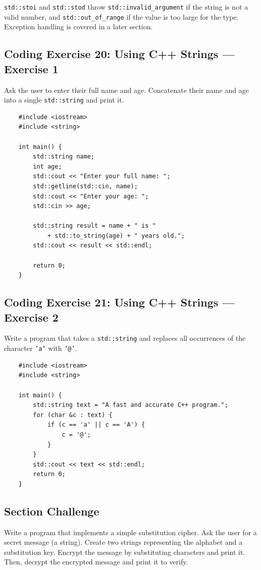 \begin{remark}
	\texttt{std::stoi} and \texttt{std::stod} throw \texttt{std::invalid\_argument} if the string is not a valid number, and \texttt{std::out\_of\_range} if the value is too large for the type. Exception handling is covered in a later section.
\end{remark}

\subsection{Coding Exercise 20: Using C++ Strings --- Exercise 1}
Ask the user to enter their full name and age. Concatenate their name and age into a single \texttt{std::string} and print it.
\begin{lstlisting}
	#include <iostream>
	#include <string>

	int main() {
		std::string name;
		int age;
		std::cout << "Enter your full name: ";
		std::getline(std::cin, name);
		std::cout << "Enter your age: ";
		std::cin >> age;

		std::string result = name + " is "
			+ std::to_string(age) + " years old.";
		std::cout << result << std::endl;

		return 0;
	}
\end{lstlisting}

\subsection{Coding Exercise 21: Using C++ Strings --- Exercise 2}
Write a program that takes a \texttt{std::string} and replaces all occurrences of the character \texttt{'a'} with \texttt{'@'}.
\begin{lstlisting}
	#include <iostream>
	#include <string>

	int main() {
		std::string text = "A fast and accurate C++ program.";
		for (char &c : text) {
			if (c == 'a' || c == 'A') {
				c = '@';
			}
		}
		std::cout << text << std::endl;
		return 0;
	}
\end{lstlisting}

\subsection{Section Challenge}
Write a program that implements a simple substitution cipher. Ask the user for a secret message (a string). Create two strings representing the alphabet and a substitution key. Encrypt the message by substituting characters and print it. Then, decrypt the encrypted message and print it to verify.

